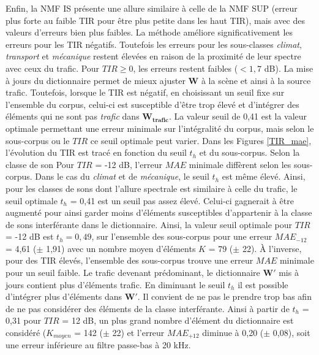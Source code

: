 Enfin, la NMF IS présente une allure similaire à celle de la NMF SUP (erreur plus forte au faible TIR pour être plus petite dans les haut TIR), mais avec des valeurs d'erreurs bien plus faibles. La méthode améliore significativement les erreurs pour les TIR négatifs. Toutefois les erreurs pour les sous-classes \textit{climat}, \textit{transport} et \textit{mécanique} restent élevées en raison de la proximité de leur spectre avec ceux du trafic. Pour $TIR \geq 0$, les erreurs restent faibles ($< 1,7$ dB). La mise à jours du dictionnaire permet de mieux ajuster $\mathbf{W}$ à la scène et ainsi à la source trafic. Toutefois, lorsque le TIR est négatif, en choisissant un seuil fixe sur l'ensemble du corpus, celui-ci est susceptible d'être trop élevé et d'intégrer des éléments qui ne sont pas \textit{trafic} dans $\mathbf{W_{trafic}}$. 
La valeur seuil de 0,41 est la valeur optimale permettant une erreur minimale sur l'intégralité du corpus, mais selon le sous-corpus ou le $TIR$ ce seuil optimale peut varier. Dans les Figures \ref{TIR_mae}, l'évolution du TIR est tracé en fonction du seuil $t_h$ et du sous-corpus. Selon la classe de son
Pour $TIR$ = -12 dB, l'erreur $MAE$ minimale diffèrent selon les sous-corpus. Dans le cas du \textit{climat} et de \textit{mécanique}, le seuil $t_h$ est même élevé. Ainsi, pour les classes de sons dont l'allure spectrale est similaire à celle du trafic, le seuil optimale $t_h$ = 0,41 est un seuil pas assez élevé. Celui-ci gagnerait à être augmenté pour ainsi garder moins d'éléments susceptibles d'appartenir à la classe de sons interférante dans le dictionnaire.
Ainsi, la valeur seuil optimale pour $TIR$ = -12 dB est $t_h = 0,49$, sur l'ensemble des sous-corpus pour une erreur $MAE_{-12}$ = 4,61 ($\pm$ 1,91) avec un nombre moyen d'éléments $K$ = 79 ($\pm$ 22). 
À l'inverse, pour des TIR élevés, l'ensemble des sous-corpus trouve une erreur $MAE$ minimale pour un seuil faible. Le trafic devenant prédominant, le dictionnaire $\mathbf{W'}$ mis à jours contient plus d'éléments trafic. En diminuant le seuil $t_h$ il est possible d'intégrer plus d'éléments dans $\mathbf{W'}$. Il convient de ne pas le prendre trop bas afin de ne pas considérer des éléments de la classe interférante. Ainsi à partir de $t_h$ = 0,31 pour $TIR$ = 12 dB, un plus grand nombre d'élément du dictionnaire est considéré ($K_{moyen}$ = 142 ($\pm$ 22) et l'erreur $MAE_{+12}$ diminue à 0,20 ($\pm$ 0,08), soit une erreur inférieure au filtre passe-bas à 20 kHz.


